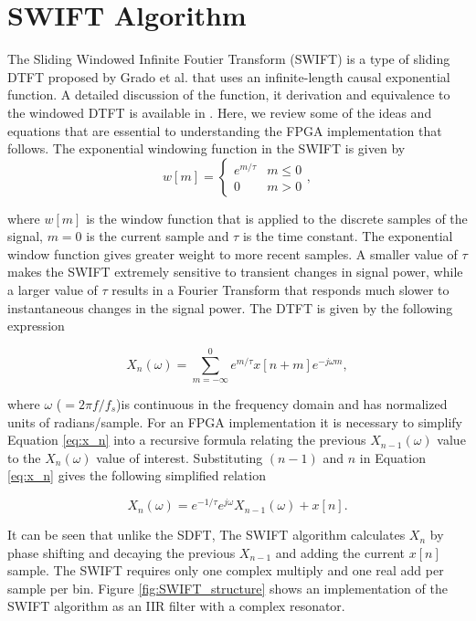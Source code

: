 \section{SWIFT Algorithm}
\label{Sec:SWIFT}

The Sliding Windowed Infinite Foutier Transform (SWIFT) is a type of sliding DTFT proposed by Grado et al. \cite{Grado2017} that uses an infinite-length causal exponential function. A detailed discussion of the function, it derivation and equivalence to the windowed DTFT is available in \cite{Grado2017}. Here, we review some of the ideas and equations that are essential to understanding the FPGA implementation that follows. The exponential windowing function in the SWIFT is given by  
\begin{equation}
w[m] = \begin{cases}e^{m/\tau} & m \leq 0\\0 & m > 0\end{cases},
\end{equation}

where $w[m]$ is the window function that is applied to the discrete samples of the signal, $m = 0$ is the current sample and $\tau$ is the time constant. The exponential window function gives greater weight to more recent samples. A smaller value of $\tau$ makes the SWIFT extremely sensitive to transient changes in signal power, while a larger value of $\tau$ results in a Fourier Transform that responds much slower to instantaneous changes in the signal power. The DTFT is given by the following expression

\begin{equation}
\label{eq:x_n}
X_n(\omega) = \sum_{m=-\infty}^0 e^{m/\tau} x[n+m] e^{-j\omega m},
\end{equation}

where $\omega$ ($ = 2\pi f/f_s$)is continuous in the frequency domain and has normalized units of radians/sample. For an FPGA implementation it is necessary to simplify Equation \ref{eq:x_n} into a recursive formula relating the previous $X_{n-1}(\omega)$ value to the $X_n(\omega)$ value of interest. Substituting $(n-1)$ and $n$ in Equation \ref{eq:x_n} gives the following simplified relation

\begin{equation}
\label{eq:X_n_X_n1}
X_n(\omega) = e^{-1/\tau}e^{j\omega}X_{n-1}(\omega) + x[n].
\end{equation}

It can be seen that unlike the SDFT, The  SWIFT  algorithm  calculates $X_n$ by phase shifting and decaying the previous $X_{n-1}$ and adding the  current $x[n]$ sample. The SWIFT requires only one complex multiply and one real add per sample per bin. Figure \ref{fig:SWIFT_structure} shows an implementation of the SWIFT algorithm as an IIR filter with a complex resonator.

